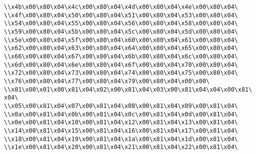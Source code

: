 \verb|\\x4b\x00\x80\x04\x4c\x00\x80\x04\x4d\x00\x80\x04\x4e\x00\x80\x04\|\newline
\verb|\\x4f\x00\x80\x04\x50\x00\x80\x04\x51\x00\x80\x04\x53\x00\x80\x04\|\newline
\verb|\\x54\x00\x80\x04\x55\x00\x80\x04\x56\x00\x80\x04\x58\x00\x80\x04\|\newline
\verb|\\x59\x00\x80\x04\x5b\x00\x80\x04\x5c\x00\x80\x04\x5d\x00\x80\x04\|\newline
\verb|\\x5e\x00\x80\x04\x5f\x00\x80\x04\x60\x00\x80\x04\x61\x00\x80\x04\|\newline
\verb|\\x62\x00\x80\x04\x63\x00\x80\x04\x64\x00\x80\x04\x65\x00\x80\x04\|\newline
\verb|\\x66\x00\x80\x04\x67\x00\x80\x04\x6b\x00\x80\x04\x6c\x00\x80\x04\|\newline
\verb|\\x6d\x00\x80\x04\x6e\x00\x80\x04\x6f\x00\x80\x04\x70\x00\x80\x04\|\newline
\verb|\\x72\x00\x80\x04\x73\x00\x80\x04\x74\x00\x80\x04\x75\x00\x80\x04\|\newline
\verb|\\x76\x00\x80\x04\x77\x00\x80\x04\x79\x00\x80\x04\x00\x00\|\newline
\verb|\\x01\x00\x01\x00\x81\x04\x02\x00\x81\x04\x03\x00\x81\x04\x04\x00\x81\x04\|\newline
\verb|\\x05\x00\x81\x04\x07\x00\x81\x04\x08\x00\x81\x04\x09\x00\x81\x04\|\newline
\verb|\\x0a\x00\x81\x04\x0b\x00\x81\x04\x0c\x00\x81\x04\x0d\x00\x81\x04\|\newline
\verb|\\x0e\x00\x81\x04\x10\x00\x81\x04\x12\x00\x81\x04\x13\x00\x81\x04\|\newline
\verb|\\x14\x00\x81\x04\x15\x00\x81\x04\x16\x00\x81\x04\x17\x00\x81\x04\|\newline
\verb|\\x18\x00\x81\x04\x19\x00\x81\x04\x1a\x00\x81\x04\x1d\x00\x81\x04\|\newline
\verb|\\x1e\x00\x81\x04\x20\x00\x81\x04\x21\x00\x81\x04\x22\x00\x81\x04\|\newline
